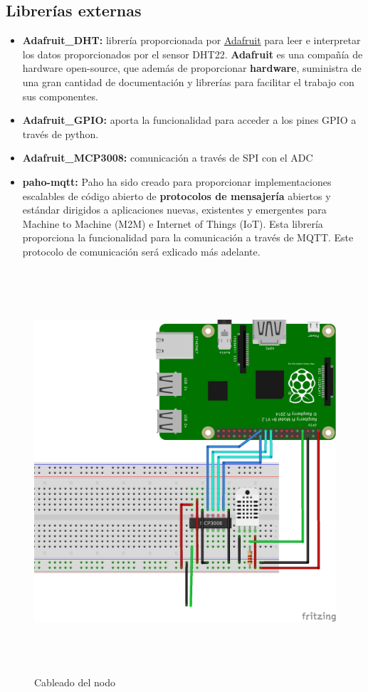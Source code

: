 \subsection{Librerías externas}

\begin{itemize}  
\item \textbf{Adafruit\_DHT:} librería proporcionada por \href{https://www.adafruit.com/}{Adafruit} para leer e interpretar los datos proporcionados por el sensor DHT22. \textbf{Adafruit} es una compañía de hardware open-source, que además de proporcionar \textbf{hardware}, suministra de una gran cantidad de documentación y librerías para facilitar el trabajo con sus componentes. 
\item \textbf{Adafruit\_GPIO:} aporta la funcionalidad para acceder a los pines GPIO a través de python.
\item \textbf{Adafruit\_MCP3008:} comunicación a través de SPI con el ADC
\item \textbf{paho-mqtt:} Paho ha sido creado para proporcionar implementaciones escalables de código abierto de \textbf{protocolos de mensajería} abiertos y estándar dirigidos a aplicaciones nuevas, existentes y emergentes para Machine to Machine (M2M) e Internet of Things (IoT). Esta librería proporciona la funcionalidad para la comunicación a través de MQTT. Este protocolo de comunicación será exlicado más adelante.
\end{itemize}

\begin{figure}[htb]
	
	\begin{center}
		\includegraphics[width=15cm,height=15cm]{figures/solar_project_node_diagram.png}
		\caption{Cableado del nodo}
	\end{center}
	
	\label{node-diagram}
\end{figure}

